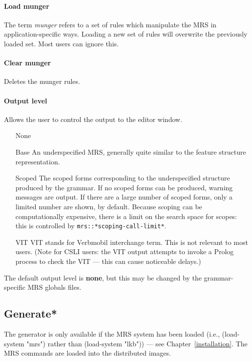 \documentclass[12pt]{report}
\newcommand{\lkbparam}[1]{{\tt #1}}
\newcommand{\newterm}[1]{{\it #1}}
\begin{document}
\paragraph{Load munger} 

The term \newterm{munger} refers to a set of rules which
manipulate the MRS in application-specific ways.  
Loading a new set of rules will overwrite the previously loaded set.
Most users can ignore this.

\paragraph{Clear munger}

Deletes the munger rules.  

\paragraph{Output level}

Allows the user to control the output to the editor window. 
\begin{enumerate}
\item[None]
\item[Base]  An underspecified MRS, generally quite similar to
the feature structure representation.
\item[Scoped] The scoped forms corresponding to the
underspecified structure produced by the grammar.
If no scoped forms can be produced, warning messages
are output.  If there are a large number of scoped forms, only a limited number
are shown, by default.  Because scoping can be computationally
expensive, there is a limit on the search space for scopes: this
is controlled by \lkbparam{mrs::*scoping-call-limit*}.
\item[VIT] VIT stands for Verbmobil interchange term.  This is not relevant
to most users.  (Note for CSLI users: the VIT output 
attempts to invoke a Prolog process to check the VIT --- 
this can cause noticeable
delays.)
\end{enumerate}
 The default output level is {\bf none}, but this may be changed by
the grammar-specific MRS globals files.


\subsection{Generate*}
\label{gencommands}

The generator is only available if the MRS system has been loaded
(i.e., (load-system "mrs") rather than (load-system "lkb")) --- see
Chapter~\ref{installation}.  The MRS commands are loaded into the distributed
images.
\end{document}
